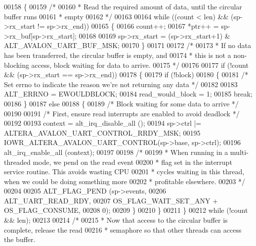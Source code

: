 \begin{DoxyCode}
00158   \{
00159     \textcolor{comment}{/*}
00160 \textcolor{comment}{     * Read the required amount of data, until the circular buffer runs}
00161 \textcolor{comment}{     * empty}
00162 \textcolor{comment}{     */}
00163 
00164     \textcolor{keywordflow}{while} ((count < len) && (sp->rx_start != sp->rx_end))
00165     \{
00166       count++;
00167       *ptr++ = sp->rx\_buf[sp->rx_start];
00168       
00169       sp->rx_start = (sp->rx_start+1) & ALT_AVALON_UART_BUF_MSK;
00170     \}
00171 
00172     \textcolor{comment}{/*}
00173 \textcolor{comment}{     * If no data has been transferred, the circular buffer is empty, and}
00174 \textcolor{comment}{     * this is not a non-blocking access, block waiting for data to arrive.}
00175 \textcolor{comment}{     */}
00176 
00177     \textcolor{keywordflow}{if} (!count && (sp->rx_start == sp->rx_end))
00178     \{
00179       \textcolor{keywordflow}{if} (!block)
00180       \{
00181         \textcolor{comment}{/* Set errno to indicate the reason we're not returning any data */}
00182 
00183         ALT_ERRNO = EWOULDBLOCK;
00184         read\_would\_block = 1;
00185         \textcolor{keywordflow}{break};
00186       \}
00187       \textcolor{keywordflow}{else}
00188       \{
00189        \textcolor{comment}{/* Block waiting for some data to arrive */}
00190 
00191        \textcolor{comment}{/* First, ensure read interrupts are enabled to avoid deadlock */}
00192 
00193        context = alt_irq_disable_all ();
00194        sp->ctrl |= ALTERA_AVALON_UART_CONTROL_RRDY_MSK;
00195        IOWR_ALTERA_AVALON_UART_CONTROL(sp->base, sp->ctrl);
00196        alt_irq_enable_all (context);
00197 
00198        \textcolor{comment}{/*}
00199 \textcolor{comment}{        * When running in a multi-threaded mode, we pend on the read event }
00200 \textcolor{comment}{        * flag set in the interrupt service routine. This avoids wasting CPU}
00201 \textcolor{comment}{        * cycles waiting in this thread, when we could be doing something more }
00202 \textcolor{comment}{        * profitable elsewhere.}
00203 \textcolor{comment}{        */}
00204 
00205        ALT_FLAG_PEND (sp->events, 
00206                       ALT_UART_READ_RDY,
00207                       OS\_FLAG\_WAIT\_SET\_ANY + OS\_FLAG\_CONSUME,
00208                       0);
00209       \}
00210     \}
00211   \}
00212   \textcolor{keywordflow}{while} (!count && len);
00213 
00214   \textcolor{comment}{/*}
00215 \textcolor{comment}{   * Now that access to the circular buffer is complete, release the read}
00216 \textcolor{comment}{   * semaphore so that other threads can access the buffer.}

\end{DoxyCode}
